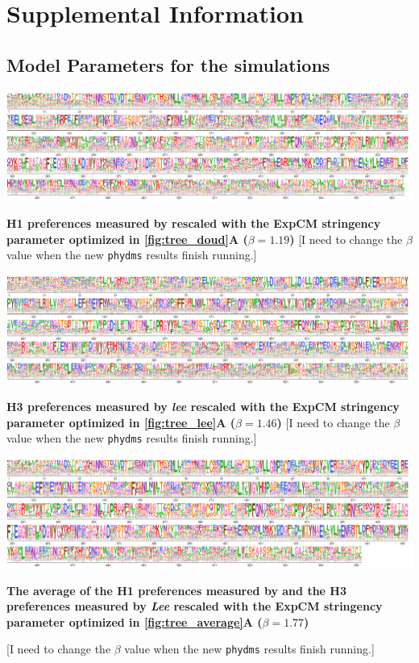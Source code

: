 \documentclass[11pt]{article}
\newcommand\skhcomment[1]{{\color{cyan}[#1]}}
\begin{document}
\newpage
\section*{Supplemental Information}

\subsection*{Model Parameters for the simulations}

\begin{suppfig}[H]
\centerline{\includegraphics[width=\textwidth]{figures/prefs_doud}}
\caption{\label{suppfig:prefs_doud}
\textbf{H1 preferences measured by \cite{doud2016accurate} rescaled with the ExpCM stringency parameter optimized in \ref{fig:tree_doud}A  ($\beta = 1.19$)} 
\skhcomment{I need to change the $\beta$ value when the new \texttt{phydms} results finish running.}
}
\end{suppfig}

\begin{suppfig}[H]
\centerline{\includegraphics[width=\textwidth]{figures/prefs_lee}}
\caption{\label{suppfig:prefs_lee}
\textbf{H3 preferences measured by \textit{lee} rescaled with the ExpCM stringency parameter optimized in \ref{fig:tree_lee}A  ($\beta = 1.46$)}
\skhcomment{I need to change the $\beta$ value when the new \texttt{phydms} results finish running.} 
}
\end{suppfig}

\begin{suppfig}[H]
\centerline{\includegraphics[width=\textwidth]{figures/prefs_average}}
\caption{\label{fig:prefs_average}
\textbf{The average of the H1 preferences measured by \cite{doud2016accurate} and the H3 preferences measured by \textit{Lee} rescaled with the ExpCM stringency parameter optimized in \ref{fig:tree_average}A  ($\beta = 1.77$)}}
\skhcomment{I need to change the $\beta$ value when the new \texttt{phydms} results finish running.}
\end{suppfig}
 
\end{document}
